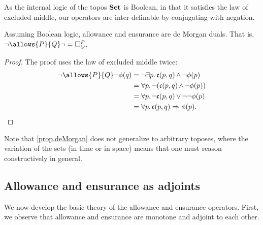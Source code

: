  
    As the internal logic of the topos $\operatorname{\textbf{Set}}$ is Boolean, in that it satisfies the law of excluded middle, our operators are inter-definable by conjugating with negation. 
    
    \begin{prop}\label{prop.deMorgan}
    Assuming Boolean logic, allowance and ensurance are de Morgan duals. That is, $\neg \allows{P}{Q} \neg = \ensure{P}{Q}$.
    \end{prop}
    \begin{proof} The proof uses the law of excluded middle twice:
    \begin{align*}
        \neg \allows{P}{Q} \neg \phi(q) &= \neg \exists p.\, \mathfrak{c}(p, q) \meet \neg \phi(p) \\
            &= \forall p.\, \neg (\mathfrak{c}(p, q) \meet \neg \phi(p)) \\
            &= \forall p.\, \neg \mathfrak{c}(p, q) \join \neg\neg \phi(p) \\
            &= \forall p.\, \mathfrak{c}(p, q) \Rightarrow \phi(p). \qedhere
    \end{align*}
    \end{proof}
    Note that \cref{prop.deMorgan} does not generalize to arbitrary toposes, where the variation of the sets (in time or in space) means that one must reason constructively in general.
    
\subsection{Allowance and ensurance as adjoints}
We now develop the basic theory of the allowance and ensurance operators. First, we observe that allowance and ensurance are monotone and adjoint to each other.   
    
